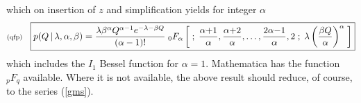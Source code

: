 \documentclass[11pt]{article}
\newcommand{\lleq}[1]{\label{#1} }
\renewcommand{\lleq}[1]{\label{#1} {\scriptstyle {\rm (#1)}} \hspace*{2ex} }
\newcommand{\cond}{\,|\,}
\begin{document}
\begin{itemize}
\begin{align}
        \nonumber\\
  \end{align}
  which on insertion of $z$ and simplification yields for integer $\alpha$
  \begin{equation}
    \lleq{qfp}
    \boxed{
      p(Q\cond \lambda,\alpha,\beta)
      =
    \frac{\lambda\beta^\alpha Q^{\alpha-1} e^{-\lambda - \beta Q} }{(\alpha-1)!}\;
    {}_0F_\alpha\left[ \;;\;
        \frac{\alpha{+}1}{\alpha},
        \frac{\alpha{+}2}{\alpha},
        \ldots,
        \frac{2\alpha{-}1}{\alpha},
        2
        \;;\; \lambda\left(\frac{\beta Q}{\alpha}\right)^\alpha \;\right]
      }
  \end{equation}
  which includes the $I_1$ Bessel function for $\alpha=1$. Mathematica
  has the function ${}_pF_q$ available. Where it is not available, the
  above result should reduce, of course, to the series (\ref{gms}).
\end{itemize}



\end{document}
